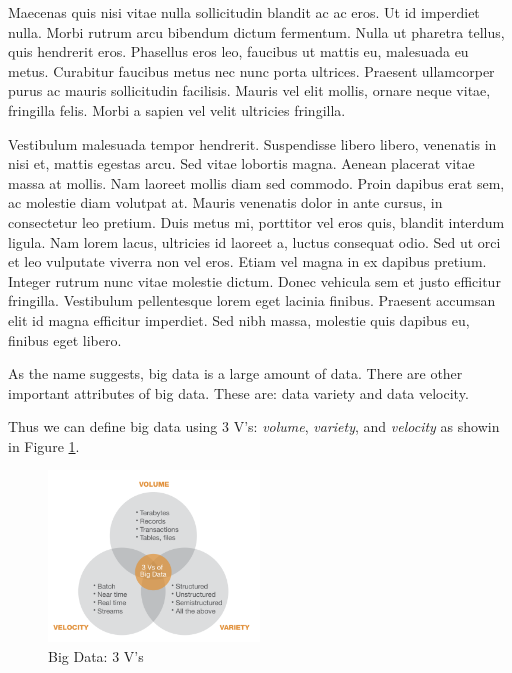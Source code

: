 Maecenas quis nisi vitae nulla sollicitudin blandit ac ac eros. Ut id imperdiet nulla. Morbi rutrum arcu bibendum dictum fermentum. Nulla ut pharetra tellus, quis hendrerit eros. Phasellus eros leo, faucibus ut mattis eu, malesuada eu metus. Curabitur faucibus metus nec nunc porta ultrices. Praesent ullamcorper purus ac mauris sollicitudin facilisis. Mauris vel elit mollis, ornare neque vitae, fringilla felis. Morbi a sapien vel velit ultricies fringilla.

Vestibulum malesuada tempor hendrerit. Suspendisse libero libero, venenatis in nisi et, mattis egestas arcu. Sed vitae lobortis magna. Aenean placerat vitae massa at mollis. Nam laoreet mollis diam sed commodo. Proin dapibus erat sem, ac molestie diam volutpat at. Mauris venenatis dolor in ante cursus, in consectetur leo pretium. Duis metus mi, porttitor vel eros quis, blandit interdum ligula. Nam lorem lacus, ultricies id laoreet a, luctus consequat odio. Sed ut orci et leo vulputate viverra non vel eros. Etiam vel magna in ex dapibus pretium. Integer rutrum nunc vitae molestie dictum. Donec vehicula sem et justo efficitur fringilla. Vestibulum pellentesque lorem eget lacinia finibus. Praesent accumsan elit id magna efficitur imperdiet. Sed nibh massa, molestie quis dapibus eu, finibus eget libero.

As the name suggests, big data is a large amount of data. There are other important attributes of big data. These are:  data variety and data velocity.

Thus we can define big data using 3 V's: \textit{volume}, \textit{variety}, and \textit{velocity} as showin in Figure \ref*{bigData}.

\begin{figure}[h]
    \centering
    \includegraphics[width=0.5\textwidth]{images/big_data.png}
    \caption{Big Data: 3 V's}
    \label{bigData}
\end{figure}